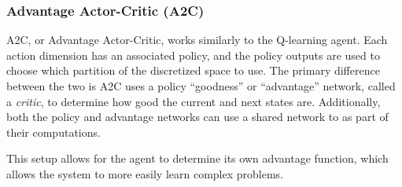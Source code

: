 \subsubsection{Advantage Actor-Critic (A2C)}
A2C, or Advantage Actor-Critic, works similarly to the Q-learning agent.
Each action dimension has an associated policy, and the policy outputs are used to
choose which partition of the discretized space to use.
The primary difference between the two is A2C uses a policy ``goodness'' or
``advantage'' network, called a \textit{critic}, to determine how good the current
and next states are.
Additionally, both the policy and advantage networks can use a shared network to as
part of their computations.

This setup allows for the agent to determine its own advantage function, which
allows the system to more easily learn complex problems.
